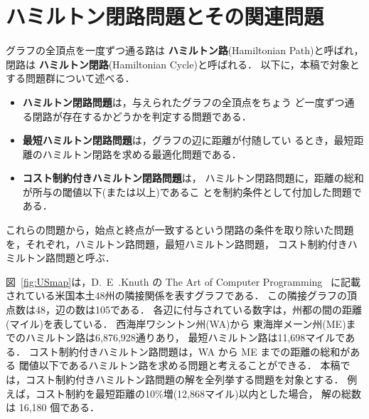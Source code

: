 ﻿%
\section{ハミルトン閉路問題とその関連問題}\label{chap:background}


グラフの全頂点を一度ずつ通る路は
\textbf{ハミルトン路}(Hamiltonian Path)と呼ばれ，
閉路は
\textbf{ハミルトン閉路}(Hamiltonian Cycle)と呼ばれる．
以下に，本稿で対象とする問題群について述べる．
\begin{itemize}
\item \textbf{ハミルトン閉路問題}は，与えられたグラフの全頂点をちょう
  ど一度ずつ通る閉路が存在するかどうかを判定する問題である．
\item \textbf{最短ハミルトン閉路問題}は，グラフの辺に距離が付随してい
  るとき，最短距離のハミルトン閉路を求める最適化問題である．
\item \textbf{コスト制約付きハミルトン閉路問題}は，
  ハミルトン閉路問題に，距離の総和が所与の閾値以下(または以上)であるこ
  とを制約条件として付加した問題である\cite{comp20:Minato}．
\end{itemize}
これらの問題から，始点と終点が一致するという閉路の条件を取り除いた問題
を，それぞれ，ハミルトン路問題，最短ハミルトン路問題，
コスト制約付きハミルトン路問題と呼ぶ．

図~\ref{fig:USmap}は，D.~E~.Knuth の
The Art of Computer Programming~\cite{Knuth:TAOCP:BDD}
に記載されている米国本土48州の隣接関係を表すグラフである．
この隣接グラフの頂点数は48，辺の数は105である．
各辺に付与されている数字は，州都の間の距離(マイル)を表している．
西海岸ワシントン州(WA)から
東海岸メーン州(ME)までのハミルトン路は6,876,928通りあり，
最短ハミルトン路は11,698マイルである．
コスト制約付きハミルトン路問題は，WA から ME までの距離の総和がある
閾値以下であるハミルトン路を求める問題と考えることができる．
本稿では，コスト制約付きハミルトン路問題の解を全列挙する問題を対象とする．
例えば，コスト制約を最短距離の10\%増(12,868マイル)以内とした場合，
解の総数は 16,180 個である．

